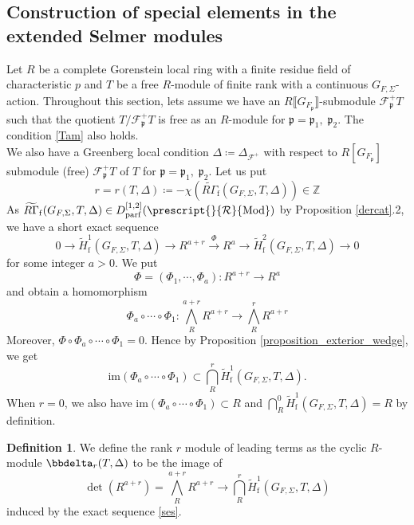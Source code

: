 \documentclass[10pt]{amsart}
\numberwithin{equation}{section}
\theoremstyle{definition}
\newtheorem{defn}[thm]{Definition}
\theoremstyle{remark} %
\newcommand{\scrF}{\mathscr{F}}
\newcommand{\p}{\mathfrak{p}}
\newcommand{\R}{\mathcal{R}}
\newcommand{\Z}{\mathbb{Z}}
\begin{document}
		\subsection{Construction of special elements in the extended Selmer modules}
		Let $R$ be a complete Gorenstein local ring with a finite residue field of characteristic $p$ and $T$ be a free $R$-module of finite rank with a continuous $G_{F,\Sigma}$-action. Throughout this section, lets assume we have an $R\llbracket G_{F_\p}\rrbracket$-submodule $\scrF^+_\p T$ such that the quotient $T/\scrF^+_\p T$ is free as an $R$-module for $ \p = \p_1, \; \p_2 $. The condition \ref{Tam} also holds. \\
		We also have a Greenberg local condition $\Delta\coloneqq \Delta_{\scrF^+}$ with respect to $R[G_{F_{\p}}]$ submodule (free) $\scrF^+_{\p}T$ of $T$ for $ \p = \p_1, \; \p_2 $. Let us put
		$$ r= r(T,\Delta) \coloneqq -\chi(\widetilde{R\Gamma}_{\mathrm{f}}(G_{F,\Sigma},T,\Delta)) \in \Z $$
		As $ \widetilde{R\Gamma}_{\mathrm{f}}(G_{F,\Sigma},T,\Delta) \in D^{[1,2]}_{\mathrm{parf}}(\prescript{}{\R}{\mathrm{Mod}}) $ by Proposition \ref{dercat}.2, we have a short exact sequence 
		\begin{equation}
			\label{ses}
			0 \rightarrow \widetilde{H}^1_{\mathrm{f}}(G_{F,\Sigma},T,\Delta) \rightarrow R^{a+r} \xrightarrow{\varPhi} R^a \rightarrow \widetilde{H}^2_{\mathrm{f}}(G_{F,\Sigma},T,\Delta) \rightarrow 0
		\end{equation}
		for some integer $ a >0 $. We put 
		\[ \varPhi = (\varPhi_1, \cdots , \varPhi_a) \colon  R^{a+r} \rightarrow R^a \]
		and obtain a homomorphism 
		\[ \varPhi_a\circ \cdots \circ \varPhi_1 \colon \bigwedge_R^{a+r} R^{a+r} \to \bigwedge_R^{r} R^{a+r} \]
		Moreover, $ \varPhi \circ \varPhi_a\circ \cdots \circ \varPhi_1 =0 $. Hence by Proposition \ref{proposition_exterior_wedge}, we get 
		\[ \mathrm{im}(\varPhi_a\circ \cdots \circ \varPhi_1) \subset \bigcap_R^r \widetilde{H}^1_{\mathrm{f}}(G_{F,\Sigma},T,\Delta). \]
		When $ r=0 $, we also have $ \mathrm{im}(\varPhi_a\circ \cdots \circ \varPhi_1) \subset R $ and $ \bigcap_R^0 \widetilde{H}^1_{\mathrm{f}}(G_{F,\Sigma},T,\Delta) =R $ by definition.
		\begin{defn}
			We define the rank $ r $ module of leading terms as the cyclic $ R $-module $ \bbdelta_r(T,\Delta) $ to be the image of
			\[ \det(R^{a+r}) = \bigwedge_R^{a+r} R^{a+r} \rightarrow \bigcap_R^r \widetilde{H}^1_{\mathrm{f}}(G_{F,\Sigma},T,\Delta) \]
			induced by the exact sequence \ref{ses}.
		\end{defn}
\end{document}
